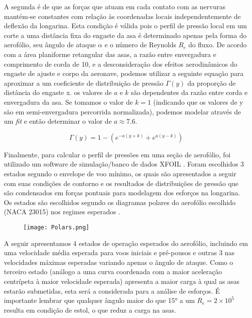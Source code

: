 \documentclass[a4paper]{article}
\begin{document}
A segunda é de que as forças que atuam em cada contato com as nervuras mantém-se constantes com relação às coordenadas locais independentemente de deflexão da longarina. Esta condição é válida pois o perfil de pressão local em um corte a uma distância fixa do engaste da asa é determinado apenas pela forma do aerofólio, seu ângulo de ataque $\alpha$ e o número de Reynolds $R_e$ do fluxo. De acordo com a área planiforme retangular das asas, a razão entre envergadura e comprimento de corda de 10, e a desconsideração dos efeitos aerodinâmicos do engaste de ajuste e corpo da aeronave, podemos utilizar a seguinte equação para aproximar a um coeficiente de distribuição de pressão $\Gamma(y)$ da proporção de distância do engaste x. os valores de $a$ e $k$ são dependentes da razão entre corda e envergadura da asa. Se tomamos o valor de $k=1$ (indicando que os valores de y são em semi-envergadura percorrida normalizada), podemos modelar através de um \textit{fit} \cite{WPIpaper} e então determinar o valor de $a\approx 7.6$.

\vspace{0.5cm}

\begin{equation}
    \Gamma(y) = 1-\left(e^{-a\left(y+k\right)}+e^{a\left(y-k\right)}\right)
\end{equation}

\vspace{0.5cm}

Finalmente, para calcular o perfil de pressões em uma seção de aerofólio, foi utilizado um software de simulação/banco de dados XFOIL \cite{xfoil}. Foram escolhidos 3 estados segundo o envelope de voo mínimo, os quais são apresentados a seguir com suas condições de contorno e os resultados de distribuições de pressão que são condensados em forças pontuais para modelagem dos esforços na longarina. Os estados são escolhidos segundo os diagramas polares do aerofólio escolhido (NACA 23015) nos regimes esperados \cite{aftools}.

\begin{figure}[H]
    \texttt{[image: Polars.png]}
\end{figure}

A seguir apresentamos 4 estados de operação esperados do aerofólio, incluindo em uma velocidade média esperada para voos iniciais e pré-pousos e outras 3 nas velocidades máximas esperadas variando apenas o ângulo de ataque. Como o terceiro estado (análogo a uma curva coordenada com a maior aceleração centrípeta à maior velocidade esperada) apresenta a maior carga à qual as asas estarão submetidas, esta será a considerada para a análise de esforços. É importante lembrar que qualquer ângulo maior do que 15° a um $R_e=2\times10^5$ resulta em condição de estol, o que reduz a carga na asas.
\end{document}
